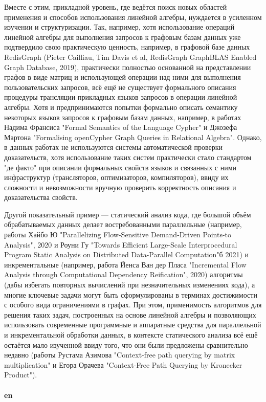 \documentclass[12pt]{article}  %
\theoremstyle{remark}
\begin{document}
Вместе с этим, прикладной уровень, где ведётся поиск новых областей применения и способов использования линейной алгебры, нуждается в усиленном изучении и структуризации. Так, например, хотя использование операций линейной алгебры для выполнения запросов к графовым базам данных уже подтвердило свою практическую ценность, например, в графовой базе данных RedisGraph (Pieter Cailliau, Tim Davis et al, RedisGraph GraphBLAS Enabled Graph Database, 2019), практически полностью основанной на представлении графов в виде матриц и использующей операции над ними для выполнения пользовательских запросов, всё ещё не существует формального описания процедуры трансляции прикладных языков запросов в операции линейной алгебры. Хотя и предпринимаются попытки формально описать семантику некоторых языков запросов к графовым базам данных, например, в работах Надима Франсиса "Formal Semantics of the Language Cypher" и Джозефа Мартона "Formalising openCypher Graph Queries
in Relational Algebra". Однако, в данных работах не используются системы автоматической проверки доказательств, хотя использование таких систем практически стало стандартом "де факто" при описании формальных свойств языков и связанных с ними инфраструктур (трансляторов, оптимизаторов, компиляторов), ввиду их сложности и невозможности вручную проверить корректность описания и доказательства свойств. 

Другой показательный пример --- статический анализ кода, где большой объём обрабатываемых данных делает востребованными параллельные (например, работы Хайбо Ю "Parallelizing Flow-Sensitive Demand-Driven Points-to Analysis", 2020 и Роуни Гу "Towards Efficient Large-Scale Interprocedural Program Static Analysis on Distributed Data-Parallel Computation"б 2021) и инкрементальные (например, работа Йенса Ван дер Пласа "Incremental Flow Analysis through Computational Dependency Reification", 2020) алгоритмы (дабы избегать повторных вычислений при незначительных изменениях кода), а многие ключевые задачи могут быть сформулированы в терминах достижимости с особого вида ограничениями в графах. При этом, применимость алгоритмов для решения таких задач, построенных на основе линейной алгебры и позволяющих использовать современные программные и аппаратные средства для параллельной и инкрементальной обработки данных, в контексте статического анализа всё ещё остаётся мало изученной ввиду того, что они были предложены сравнительно недавно (работы Рустама Азимова "Context-free path querying by matrix multiplication" и Егора Орачева "Context-Free Path Querying by Kronecker Product").
\\
\\
\textbf{en}\\
\end{document}
